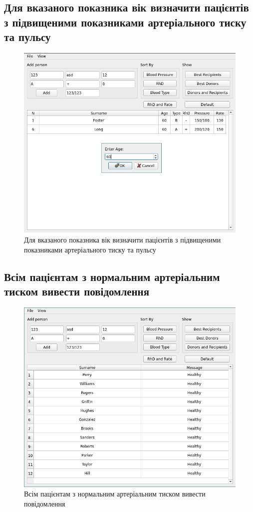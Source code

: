 \documentclass[oneside,14pt]{extarticle}
\begin{document}
\subsection{Для вказаного показника вік  визначити пацієнтів з підвищеними показниками артеріального тиску та пульсу}
\begin{figure}[H]
	\centering
	\includegraphics[scale=0.7]{11}
	\caption{Для вказаного показника вік  визначити пацієнтів з підвищеними показниками артеріального тиску та пульсу}
\end{figure}

\subsection{Всім пацієнтам з нормальним артеріальним тиском вивести повідомлення}
\begin{figure}[H]
	\centering
	\includegraphics[scale=0.7]{12}
	\caption{Всім пацієнтам з нормальним артеріальним тиском вивести повідомлення}
\end{figure}
\end{document}
